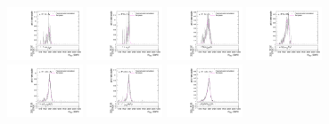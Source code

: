 \begin{figure}[htpb]
  \centering
  \includegraphics[width=0.2\textwidth]{fig/analysisAppendix/templateVsReco_VBFWprToWZ2000_r0_MVV_mu_HP_bb_LDy_linear.pdf}
  \includegraphics[width=0.2\textwidth]{fig/analysisAppendix/templateVsReco_VBFWprToWZ2000_r0_MVV_mu_LP_bb_LDy_linear.pdf}
  \includegraphics[width=0.2\textwidth]{fig/analysisAppendix/templateVsReco_VBFWprToWZ2000_r0_MVV_mu_HP_bb_HDy_linear.pdf}
  \includegraphics[width=0.2\textwidth]{fig/analysisAppendix/templateVsReco_VBFWprToWZ2000_r0_MVV_mu_LP_bb_HDy_linear.pdf}\\
  \includegraphics[width=0.2\textwidth]{fig/analysisAppendix/templateVsReco_VBFWprToWZ2000_r0_MVV_mu_HP_nobb_LDy_linear.pdf}
  \includegraphics[width=0.2\textwidth]{fig/analysisAppendix/templateVsReco_VBFWprToWZ2000_r0_MVV_mu_LP_nobb_LDy_linear.pdf}
  \includegraphics[width=0.2\textwidth]{fig/analysisAppendix/templateVsReco_VBFWprToWZ2000_r0_MVV_mu_HP_nobb_HDy_linear.pdf}

\end{figure}
